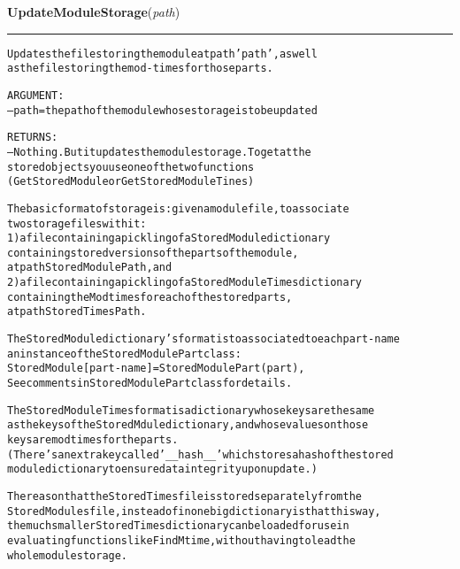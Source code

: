     \label{System:Storage:UpdateModuleStorage}

    \vspace{0.5ex}

\hspace{.8\funcindent}\begin{boxedminipage}{\funcwidth}

    \raggedright \textbf{UpdateModuleStorage}(\textit{path})

    \vspace{-1.5ex}

    \rule{\textwidth}{0.5\fboxrule}
\setlength{\parskip}{2ex}
\begin{alltt}

Updates the file storing the module at path 'path', as well
as the file storing the mod-times for those parts.   

ARGUMENT:
-- path = the path of the module whose storage is to be updated 
                
RETURNS:
-- Nothing.  But it updates the module storage.   To get at the 
stored objects you use one of the two functions 
(GetStoredModule or GetStoredModuleTines)
                
The basic format of storage is:  given a module file, to associate 
two storage files with it:  
        1) a file containing a pickling of a StoredModule dictionary 
        containing stored versions of the parts of the module, 
        at path StoredModulePath, and 
        2) a file containing a pickling of a StoredModuleTimes dictionary
        containing the Modtimes for each of the stored parts, 
        at path StoredTimesPath.  

The StoredModule dictionary's format is to associated to each part-name
an instance of the StoredModulePart class:
        StoredModule[ part-name ] =   StoredModulePart(part), 
See comments in StoredModulePart class for details. 
                
The StoredModuleTimes format is a dictionary whose keys are the same
as the keys of the StoredMdule dictionary, and whose values on those
keys are mod times for the parts.   
(There's an extra key called '\_\_hash\_\_' which stores a hash of the stored
module dictionary to ensure data integrity upon update.) 
        
The reason that the StoredTimes file is stored separately from the 
StoredModules file, instead of in one big dictionary is that this way, 
the much smaller StoredTimes dictionary can be loaded for use in 
evaluating functions like FindMtime, without having to lead the 
whole module storage.  


\end{alltt}
\end{boxedminipage}
